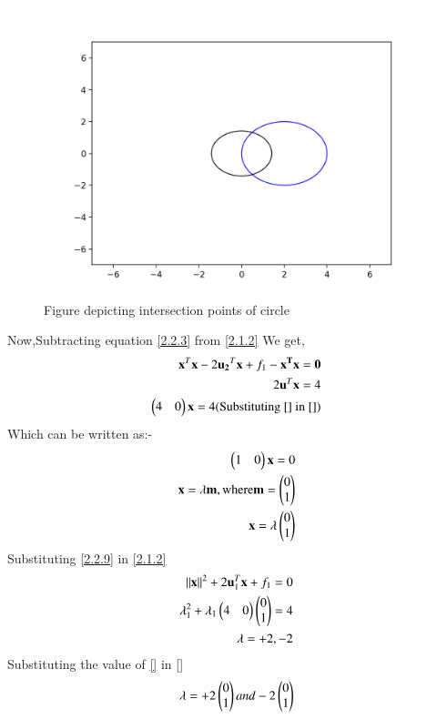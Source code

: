 \documentclass[journal,12pt,twocolumn]{IEEEtran}
\begin{document}
 \begin{figure}[h!]
	\centering
	\includegraphics[width=\columnwidth]{Assignment_5.png}
	\caption{Figure depicting intersection points of circle}
	\label{myfig}
\end{figure}
Now,Subtracting equation \eqref{2.2.3} from \eqref{2.1.2} We get,
 \begin{align}
 {\mathbf{x}^{T}\mathbf{x}-2\mathbf{u_2}^T\mathbf{x}}+f_1-\bf{x}^{T}\bf{x}=0\\
 2\mathbf{u}^{T}\mathbf{x}=4\\
 \begin{pmatrix}4&0\end{pmatrix}\mathbf{x}=4\text{(Substituting \eqref{} in \eqref{})}
 \end{align}
 Which can be written as:-
 \begin{align}
 \begin{pmatrix}1&0\end{pmatrix}\mathbf{x}=0\\
 \mathbf{x} = \lambda \mathbf{m}, \text{where} \mathbf{m} = \begin{pmatrix}0\\1\end{pmatrix}\\
 \mathbf{x} = \lambda \begin{pmatrix}0\\1\end{pmatrix}
 \end{align}
 Substituting \eqref{2.2.9} in \eqref{2.1.2}\\
 \begin{align}
 \left\lVert\mathbf{x}\right\rVert^2 + 2\mathbf{u}_1^T\mathbf{x} + f_1 = 0\\
  \lambda_1^{2}+\lambda_1\begin{pmatrix}4&0\end{pmatrix}\begin{pmatrix}0\\1\end{pmatrix}=4\\
 \lambda=+2,-2
 \end{align}
 Substituting the value of \eqref{} in \eqref{}
 \begin{align}
 \mathbf{\lambda} = +2\begin{pmatrix}0\\1\end{pmatrix} and - 2\begin{pmatrix}0\\1\end{pmatrix}
 \end{align}
\end{document}
